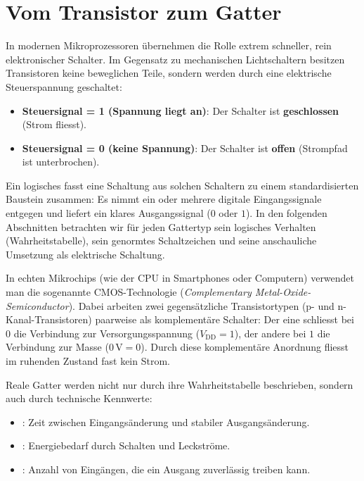 \section{Vom Transistor zum Gatter}

In modernen Mikroprozessoren übernehmen  die Rolle extrem schneller, rein elektronischer Schalter. Im Gegensatz zu mechanischen Lichtschaltern besitzen Transistoren keine beweglichen Teile, sondern werden durch eine elektrische Steuerspannung geschaltet:
\begin{itemize}
    \item \textbf{Steuersignal = 1 (Spannung liegt an)}: Der Schalter ist \textbf{geschlossen} (Strom fliesst).
    \item \textbf{Steuersignal = 0 (keine Spannung)}: Der Schalter ist \textbf{offen} (Strompfad ist unterbrochen).
\end{itemize}

Ein logisches  fasst eine Schaltung aus solchen Schaltern zu einem standardisierten Baustein zusammen: Es nimmt ein oder mehrere digitale Eingangssignale entgegen und liefert ein klares Ausgangssignal ($0$ oder $1$). In den folgenden Abschnitten betrachten wir für jeden Gattertyp sein logisches Verhalten (Wahrheitstabelle), sein genormtes Schaltzeichen und seine anschauliche Umsetzung als elektrische Schaltung.

\begin{myremark}
    In echten Mikrochips (wie der CPU in Smartphones oder Computern) verwendet man die sogenannte \gls{CMOS}-Technologie (\textit{Complementary Metal-Oxide-Semiconductor}). Dabei arbeiten zwei gegensätzliche Transistortypen (p- und n-Kanal-Transistoren) paarweise als komplementäre Schalter: Der eine schliesst bei $0$ die Verbindung zur Versorgungsspannung ($V_{\text{DD}} = 1$), der andere bei $1$ die Verbindung zur Masse ($0\,\text{V} = 0$). Durch diese komplementäre Anordnung fliesst im ruhenden Zustand fast kein Strom.
\end{myremark}

\begin{mydefinition}
    Reale Gatter werden nicht nur durch ihre Wahrheitstabelle beschrieben, sondern auch durch technische Kennwerte:
    \begin{itemize}
        \item {}: Zeit zwischen Eingangsänderung und stabiler Ausgangsänderung.
        \item {}: Energiebedarf durch Schalten und Leckströme.
        \item {}: Anzahl von Eingängen, die ein Ausgang zuverlässig treiben kann.
    \end{itemize}
\end{mydefinition}

